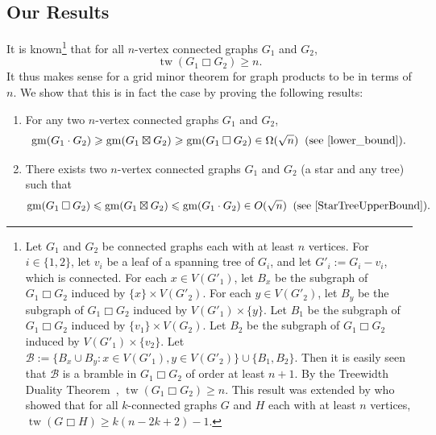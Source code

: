 \documentclass{patmorin}
\newcommand{\defn}[1]{\textcolor{Maroon}{\emph{#1}}}
\newcommand{\boxprod}{\mathbin{\Box}}
\renewcommand{\ge}{\geqslant}
\renewcommand{\le}{\leqslant}
\renewcommand{\geq}{\geqslant}
\renewcommand{\leq}{\leqslant}
\DeclareMathOperator{\tw}{tw}
\DeclareMathOperator{\gm}{gm}
\theoremstyle{plain}
\theoremstyle{definition}
\begin{document}


\subsection{Our Results}

It is known\footnote{Let $G_1$ and $G_2$ be connected graphs each with at least $n$ vertices. 
For $i\in\{1,2\}$, let $v_i$ be a leaf of a spanning tree of $G_i$, and let $G'_i:=G_i-v_i$, which is connected. For each $x\in V(G'_1)$, let $B_x$ be the subgraph of $G_1\boxprod G_2$ induced by $\{x\}\times V(G'_2)$. 
For each $y\in V(G'_2)$, let $B_y$ be the subgraph of $G_1\boxprod G_2$ induced by $V(G'_1)\times \{y\}$. 
Let $B_1$ be the subgraph of $G_1\boxprod G_2$ induced by $\{v_1\}\times V(G_2)$. 
Let $B_2$ be the subgraph of $G_1\boxprod G_2$ induced by $V(G'_1)\times \{v_2\}$. 
Let $\mathcal{B}:=\{ B_x\cup B_y: x\in V(G'_1),y\in V(G'_2)\}\cup\{B_1,B_2\}$. Then it is easily seen that $\mathcal{B}$ is a bramble in $G_1\boxprod G_2$ of order at least $n+1$. By the Treewidth Duality Theorem~\citep{ST93}, $\tw(G_1\boxprod G_2)\geq n$. This result was extended by \citet{WoodJGT13} who showed that 
for all $k$-connected graphs $G$ and $H$ each with at least $n$ vertices, $\tw(G\boxprod H) \geq k(n-2k+2)-1$. } that for all $n$-vertex connected graphs $G_1$ and $G_2$, 
\begin{equation}
    \label{LowerBoundProduct}
    \tw(G_1 \boxprod G_2) \ge n.
\end{equation}
It thus makes sense for a grid minor theorem for graph products to be in terms of $n$. 
We show that this is in fact the case
by proving the following results:


\begin{enumerate}
   \item  For any two $n$-vertex connected graphs $G_1$ and $G_2$, 
   $$\gm(G_1\cdot G_2) \geq \gm(G_1\boxtimes G_2) \geq \gm(G_1\boxprod G_2) \in \Omega(\sqrt{n})\;\;\text{(see \cref{lower_bound})}.$$
      
   \item There exists two $n$-vertex connected graphs $G_1$ and $G_2$ (a star and any tree) such that   $$\gm(G_1\boxprod G_2) \leq \gm(G_1\boxtimes G_2) \leq \gm(G_1\cdot G_2) \in O(\sqrt{n}) \;\; \text{(see \cref{StarTreeUpperBound})}.$$
   
\end{enumerate}
\end{document}
